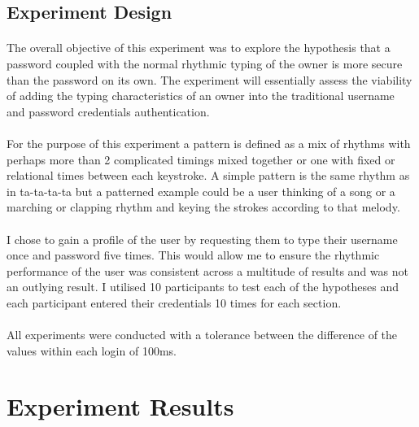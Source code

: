 \documentclass{article}
\begin{document}
\subsection{Experiment Design}
\paragraph{}
The overall objective of this experiment was to explore the hypothesis that a password coupled with the normal rhythmic typing of the owner is more secure than the password on its own. The experiment will essentially assess the viability of adding the typing characteristics of an owner into the traditional username and password credentials authentication. 

\paragraph{}
For the purpose of this experiment a pattern is defined as a mix of rhythms with perhaps more than 2 complicated timings mixed together or one with fixed or relational times between each keystroke. A simple pattern is the same rhythm as in ta-ta-ta-ta but a patterned example could be a user thinking of a song or a marching or clapping rhythm and keying the strokes according to that melody. 

\paragraph{}
I chose to gain a profile of the user by requesting them to type their username once and password five times. This would allow me to ensure the rhythmic performance of the user was consistent across a multitude of results and was not an outlying result. I utilised 10 participants to test each of the hypotheses and each participant entered their credentials 10 times for each section. 

\paragraph{}
All experiments were conducted with a tolerance between the difference of the values within each login of 100ms. 

\section{Experiment Results}
\end{document}

